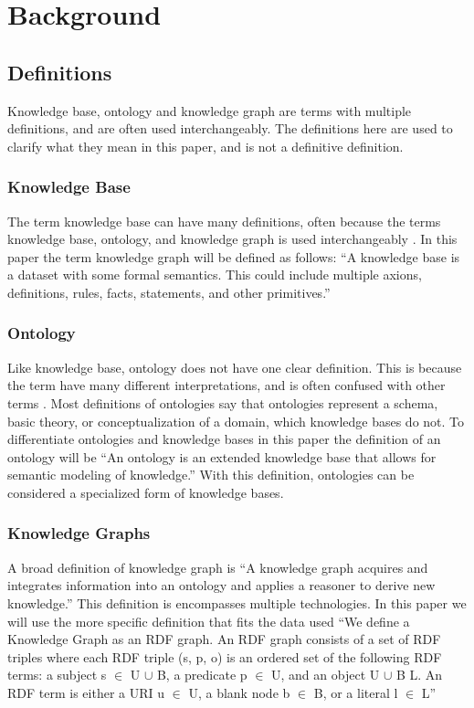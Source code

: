 
\chapter{Background}

\section{Definitions}
Knowledge base, ontology and knowledge graph are terms with multiple definitions, and are often used interchangeably. The definitions here are used to clarify what they mean in this paper, and is not a definitive definition.

\subsection{Knowledge Base}
The term knowledge base can have many definitions, often because the terms knowledge base, ontology, and knowledge graph is used interchangeably \cite{KGDef}. In this paper the term knowledge graph will be defined as follows: ``A knowledge base is a dataset with some formal semantics. This could include multiple axions, definitions, rules, facts, statements, and other primitives.'' \cite{davies2006semantic}

\subsection{Ontology}
Like knowledge base, ontology does not have one clear definition. This is because the term have many different interpretations, and is often confused with other terms \cite{FEILMAYR20161}. Most definitions of ontologies say that ontologies represent a schema, basic theory, or conceptualization of a domain, which knowledge bases do not. \cite{davies2006semantic} To differentiate ontologies and knowledge bases in this paper the definition of an ontology will be ``An ontology is an extended knowledge base that allows for semantic modeling of knowledge.'' With this definition, ontologies can be considered a specialized form of knowledge bases.

\subsection{Knowledge Graphs}
A broad definition of knowledge graph is ``A knowledge graph acquires and integrates information into an ontology and applies a reasoner to derive new knowledge.'' \cite{KGDef} This definition is encompasses multiple technologies. In this paper we will use the more specific definition that fits the data used ``We define a Knowledge Graph as an RDF graph. An RDF graph consists of a set of RDF triples where each RDF triple (s, p, o) is an ordered set of the following RDF terms: a subject s $\in$ U $\cup$ B, a predicate p $\in$ U, and an object U $\cup$ B  L. An RDF term is either a URI u $\in$ U, a blank node b $\in$ B, or a literal l $\in$ L'' \cite{KGDefYago}


